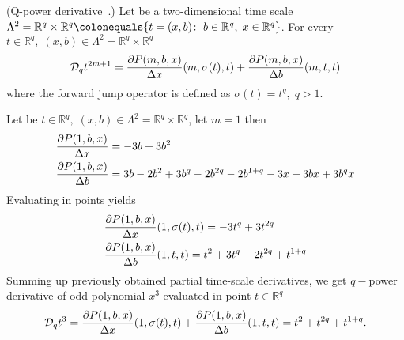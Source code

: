 \begin{cor}
    \label{q_power_derivative_case}
    (Q-power derivative~\cite{aldwoah2011power}.)
    Let be a two-dimensional time scale
    $\Lambda^2 = {\mathbb{R}}^{q} \times {\mathbb{R}}^{q} \colonequals \{t=(x,b) \colon \; b\in {\mathbb{R}}^{q}, \; x\in{\mathbb{R}}^{q} \}$.
    For every $t\in {\mathbb{R}}^{q}, \; (x,b) \in\Lambda^2 = {\mathbb{R}}^{q} \times {\mathbb{R}}^{q}$
    \begin{align*}
        \mathcal{D}_q t^{2m+1}
        = \frac{\partial P ( m, b, x )}{\Delta x}(m, \sigma(t), t)
        + \frac{\partial P ( m, b, x )}{\Delta b}(m, t, t)
    \end{align*}
    where the forward jump operator is defined as $\sigma(t) = t^q, \; q > 1$.
\end{cor}
\begin{examp}
    \label{time_scale_nq_example_1}
    Let be $t\in {\mathbb{R}}^{q}, \; (x,b) \in\Lambda^2 = {\mathbb{R}}^{q} \times {\mathbb{R}}^{q}$, let $m=1$ then
    \begin{align*}
        &\frac{\partial P ( 1, b, x )}{\Delta x} = -3 b + 3 b^2 \\
        &\frac{\partial P ( 1, b, x )}{\Delta b} = 3 b - 2 b^2 + 3 b^q - 2 b^{2 q} - 2 b^{1 + q} - 3 x + 3 b x + 3 b^q x
    \end{align*}
    Evaluating in points yields
    \begin{align*}
        &\frac{\partial P ( 1, b, x )}{\Delta x} (1, \sigma(t), t) = -3 t^q + 3 t^{2 q} \\
        &\frac{\partial P ( 1, b, x )}{\Delta b} (1, t, t) = t^2 + 3 t^q - 2 t^{2 q} + t^{1 + q}
    \end{align*}
    Summing up previously obtained partial time-scale derivatives, we get $q-$power derivative of odd polynomial
    $x^{3}$ evaluated in point $t \in {\mathbb{R}}^{q}$
    \begin{align*}
        \mathcal{D}_q t^{3}
        = \frac{\partial P ( 1, b, x )}{\Delta x} (1, \sigma(t), t)
        + \frac{\partial P ( 1, b, x )}{\Delta b} (1, t, t)
        = t^2 + t^{2 q} + t^{1 + q}.
    \end{align*}
\end{examp}
